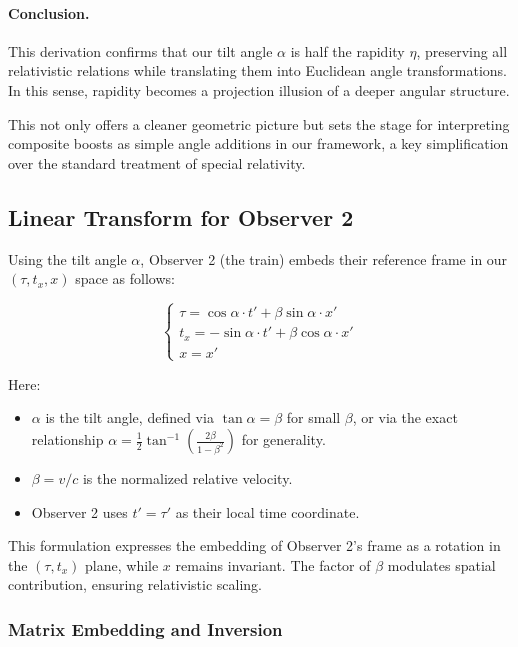 \documentclass{article}
\begin{document}
\paragraph{Conclusion.} This derivation confirms that our tilt angle $\alpha$ is half the rapidity $\eta$, preserving all relativistic relations while translating them into Euclidean angle transformations. In this sense, rapidity becomes a projection illusion of a deeper angular structure.

This not only offers a cleaner geometric picture but sets the stage for interpreting composite boosts as simple angle additions in our framework, a key simplification over the standard treatment of special relativity.




\subsection{Linear Transform for Observer 2}

Using the tilt angle $\alpha$, Observer 2 (the train) embeds their reference frame in our $(\tau, t_x, x)$ space as follows:

\begin{equation}
\begin{cases}
\tau = \cos\alpha \cdot t' + \beta\sin\alpha \cdot x' \\
t_x = -\sin\alpha \cdot t' + \beta\cos\alpha \cdot x' \\
x = x'
\end{cases}
\end{equation}

Here:
\begin{itemize}
  \item $\alpha$ is the tilt angle, defined via $\tan\alpha = \beta$ for small $\beta$, or via the exact relationship $\alpha = \frac{1}{2}\tan^{-1}\left(\frac{2\beta}{1 - \beta^2}\right)$ for generality.
  \item $\beta = v/c$ is the normalized relative velocity.
  \item Observer 2 uses $t' = \tau'$ as their local time coordinate.
\end{itemize}

This formulation expresses the embedding of Observer 2's frame as a rotation in the $(\tau, t_x)$ plane, while $x$ remains invariant. The factor of $\beta$ modulates spatial contribution, ensuring relativistic scaling.

\subsubsection{Matrix Embedding and Inversion}
\end{document}
